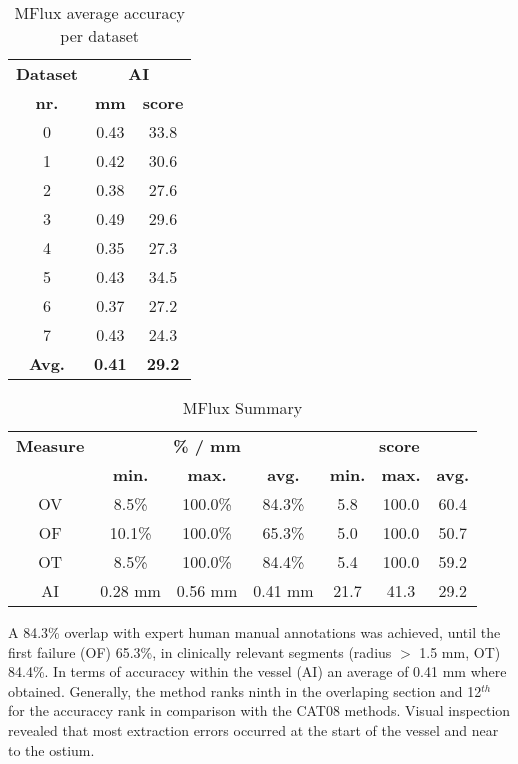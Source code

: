 \begin{table*}[h]
\scriptsize
\caption{MFlux average accuracy per dataset}
\centering
\begin{tabular}{|c|cc|}
\hline
\multicolumn{1}{|c|}{\textbf{Dataset}} &\multicolumn{2}{c|}{\textbf{AI}}\\
\multicolumn{1}{|c|}{\textbf{nr.}} &\multicolumn{1}{c|}{\textbf{mm}} &\multicolumn{1}{c|}{\textbf{score}}\\
\hline
0&0.43&33.8\\
1&0.42&30.6\\
2&0.38&27.6\\
3&0.49&29.6\\
4&0.35&27.3\\
5&0.43&34.5\\
6&0.37&27.2\\
7&0.43&24.3\\
\hline
\textbf{Avg.}&\textbf{0.41}&\textbf{29.2}\\
\hline
\end{tabular}
\vspace{-0.3cm}
\label{tb:tb_4_2}
\normalsize
\end{table*}

\begin{table*}[h]
\scriptsize
\caption{MFlux Summary}
\centering
\begin{tabular}{|c|ccc|ccc|}
\hline
\multicolumn{1}{|c|}{\textbf{Measure}} &\multicolumn{3}{c|}{\textbf{\% / mm}} &\multicolumn{3}{c|}{\textbf{score}}  \\
\multicolumn{1}{|c|}{\textbf{}} &\multicolumn{1}{c|}{\textbf{min.}} &\multicolumn{1}{c|}{\textbf{max.}} &\multicolumn{1}{c|}{\textbf{avg.}} &\multicolumn{1}{c|}{\textbf{min.}} &\multicolumn{1}{c|}{\textbf{max.}} &\multicolumn{1}{c|}{\textbf{avg.}}\\
\hline
OV& 8.5\%&100.0\%&84.3\%& 5.8&100.0&60.4\\
OF&10.1\%&100.0\%&65.3\%& 5.0&100.0&50.7\\
OT& 8.5\%&100.0\%&84.4\%& 5.4&100.0&59.2\\
AI&0.28 mm&0.56 mm&0.41 mm&21.7&41.3&29.2\\
\hline
\end{tabular}
\vspace{-0.3cm}
\label{tb:tb_4_3}
\normalsize
\end{table*}

A 84.3\% overlap with expert human manual annotations was achieved, until the first failure (OF) 65.3\%, in clinically relevant segments (radius $>$ 1.5 mm, OT) 84.4\%. In terms of accuraccy within the vessel (AI) an average of 0.41 mm where obtained. Generally, the method ranks ninth in the overlaping section and 12$^{th}$ for the accuraccy rank in comparison with the CAT08 methods. Visual inspection revealed that most extraction errors occurred at the start of the vessel and near to the ostium. 

